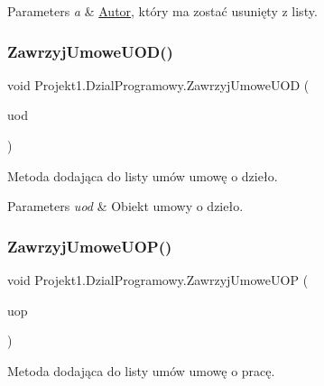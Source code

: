 \begin{DoxyParams}{Parameters}
{\em a} & \mbox{\hyperlink{class_projekt1_1_1_autor}{Autor}}, który ma zostać usunięty z listy.\\
\hline
\end{DoxyParams}
\mbox{\label{class_projekt1_1_1_dzial_programowy_ae4c62d15b8d0083f6501c44f5255abb6}} 
\subsubsection{\texorpdfstring{ZawrzyjUmoweUOD()}{ZawrzyjUmoweUOD()}}
{\footnotesize\ttfamily void Projekt1.\+Dzial\+Programowy.\+Zawrzyj\+Umowe\+U\+OD (\begin{DoxyParamCaption}\item[{\mbox{\hyperlink{class_projekt1_1_1_u_o_d}{U\+OD}}}]{uod }\end{DoxyParamCaption})}



Metoda dodająca do listy umów umowę o dzieło. 


\begin{DoxyParams}{Parameters}
{\em uod} & Obiekt umowy o dzieło.\\
\hline
\end{DoxyParams}
\mbox{\label{class_projekt1_1_1_dzial_programowy_a7814d93c057013c72d4b5f7153ed3530}} 
\subsubsection{\texorpdfstring{ZawrzyjUmoweUOP()}{ZawrzyjUmoweUOP()}}
{\footnotesize\ttfamily void Projekt1.\+Dzial\+Programowy.\+Zawrzyj\+Umowe\+U\+OP (\begin{DoxyParamCaption}\item[{\mbox{\hyperlink{class_projekt1_1_1_u_o_p}{U\+OP}}}]{uop }\end{DoxyParamCaption})}



Metoda dodająca do listy umów umowę o pracę. 


